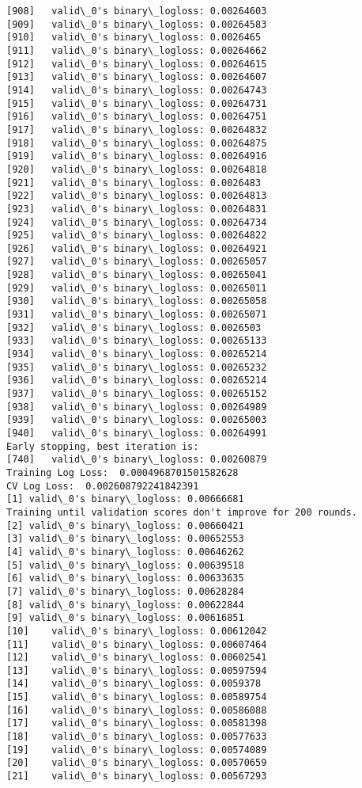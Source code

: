 \documentclass[11pt]{article}
\begin{document}
\begin{Verbatim}[commandchars=\\\{\}]
[908]	valid\_0's binary\_logloss: 0.00264603
[909]	valid\_0's binary\_logloss: 0.00264583
[910]	valid\_0's binary\_logloss: 0.0026465
[911]	valid\_0's binary\_logloss: 0.00264662
[912]	valid\_0's binary\_logloss: 0.00264615
[913]	valid\_0's binary\_logloss: 0.00264607
[914]	valid\_0's binary\_logloss: 0.00264743
[915]	valid\_0's binary\_logloss: 0.00264731
[916]	valid\_0's binary\_logloss: 0.00264751
[917]	valid\_0's binary\_logloss: 0.00264832
[918]	valid\_0's binary\_logloss: 0.00264875
[919]	valid\_0's binary\_logloss: 0.00264916
[920]	valid\_0's binary\_logloss: 0.00264818
[921]	valid\_0's binary\_logloss: 0.0026483
[922]	valid\_0's binary\_logloss: 0.00264813
[923]	valid\_0's binary\_logloss: 0.00264831
[924]	valid\_0's binary\_logloss: 0.00264734
[925]	valid\_0's binary\_logloss: 0.00264822
[926]	valid\_0's binary\_logloss: 0.00264921
[927]	valid\_0's binary\_logloss: 0.00265057
[928]	valid\_0's binary\_logloss: 0.00265041
[929]	valid\_0's binary\_logloss: 0.00265011
[930]	valid\_0's binary\_logloss: 0.00265058
[931]	valid\_0's binary\_logloss: 0.00265071
[932]	valid\_0's binary\_logloss: 0.0026503
[933]	valid\_0's binary\_logloss: 0.00265133
[934]	valid\_0's binary\_logloss: 0.00265214
[935]	valid\_0's binary\_logloss: 0.00265232
[936]	valid\_0's binary\_logloss: 0.00265214
[937]	valid\_0's binary\_logloss: 0.00265152
[938]	valid\_0's binary\_logloss: 0.00264989
[939]	valid\_0's binary\_logloss: 0.00265003
[940]	valid\_0's binary\_logloss: 0.00264991
Early stopping, best iteration is:
[740]	valid\_0's binary\_logloss: 0.00260879
Training Log Loss:  0.0004968701501582628
CV Log Loss:  0.002608792241842391
[1]	valid\_0's binary\_logloss: 0.00666681
Training until validation scores don't improve for 200 rounds.
[2]	valid\_0's binary\_logloss: 0.00660421
[3]	valid\_0's binary\_logloss: 0.00652553
[4]	valid\_0's binary\_logloss: 0.00646262
[5]	valid\_0's binary\_logloss: 0.00639518
[6]	valid\_0's binary\_logloss: 0.00633635
[7]	valid\_0's binary\_logloss: 0.00628284
[8]	valid\_0's binary\_logloss: 0.00622844
[9]	valid\_0's binary\_logloss: 0.00616851
[10]	valid\_0's binary\_logloss: 0.00612042
[11]	valid\_0's binary\_logloss: 0.00607464
[12]	valid\_0's binary\_logloss: 0.00602541
[13]	valid\_0's binary\_logloss: 0.00597594
[14]	valid\_0's binary\_logloss: 0.0059378
[15]	valid\_0's binary\_logloss: 0.00589754
[16]	valid\_0's binary\_logloss: 0.00586088
[17]	valid\_0's binary\_logloss: 0.00581398
[18]	valid\_0's binary\_logloss: 0.00577633
[19]	valid\_0's binary\_logloss: 0.00574089
[20]	valid\_0's binary\_logloss: 0.00570659
[21]	valid\_0's binary\_logloss: 0.00567293

\end{Verbatim}
\end{document}
